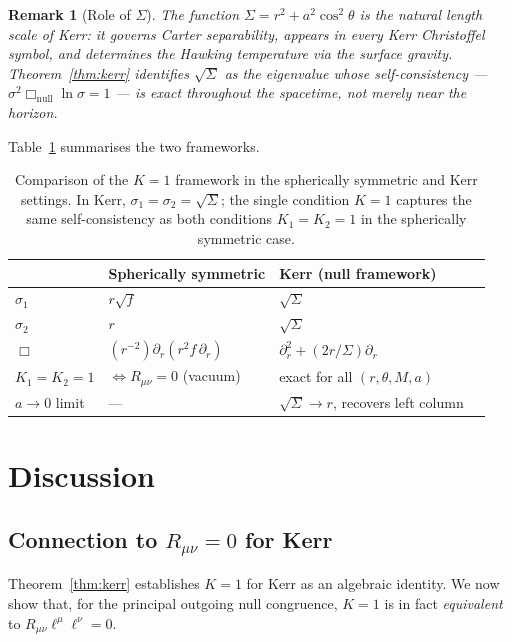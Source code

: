 \documentclass[11pt,a4paper]{article}
\newtheorem*{remark}{Remark}
\begin{document}
\begin{remark}[Role of $\Sigma$]
The function $\Sigma=r^2+a^2\cos^2\!\theta$ is the natural
length scale of Kerr: it governs Carter separability, appears in
every Kerr Christoffel symbol, and determines the Hawking
temperature via the surface gravity.
Theorem~\ref{thm:kerr} identifies $\sqrt{\Sigma}$ as the
eigenvalue whose self-consistency — $\sigma^2\Box_\mathrm{null}
\ln\sigma=1$ — is exact throughout the spacetime, not merely
near the horizon.
\end{remark}

Table~\ref{tab:comparison} summarises the two frameworks.

\begin{table}[h]
\centering
\renewcommand{\arraystretch}{1.3}
\begin{tabular}{@{}llll@{}}
\toprule
 & Spherically symmetric & Kerr (null framework) \\
\midrule
$\sigma_1$ & $r\sqrt{f}$ & $\sqrt{\Sigma}$ \\
$\sigma_2$ & $r$         & $\sqrt{\Sigma}$ \\
$\Box$ & $(r^{-2})\partial_r(r^2 f\,\partial_r)$
       & $\partial_r^2+(2r/\Sigma)\partial_r$ \\
$K_1=K_2=1$ & $\Leftrightarrow R_{\mu\nu}=0$ (vacuum) &
  exact for all $(r,\theta,M,a)$ \\
$a\to 0$ limit & --- & $\sqrt{\Sigma}\to r$, recovers left column \\
\bottomrule
\end{tabular}
\caption{Comparison of the $K{=}1$ framework in the spherically
symmetric and Kerr settings.
In Kerr, $\sigma_1=\sigma_2=\sqrt{\Sigma}$; the single condition
$K{=}1$ captures the same self-consistency as both conditions
$K_1=K_2=1$ in the spherically symmetric case.}
\label{tab:comparison}
\end{table}

\section{Discussion}\label{sec:discussion}

\subsection*{Connection to $R_{\mu\nu}=0$ for Kerr}

Theorem~\ref{thm:kerr} establishes $K{=}1$ for Kerr as an
algebraic identity.
We now show that, for the principal outgoing null congruence,
$K{=}1$ is in fact \emph{equivalent} to
$R_{\mu\nu}\ell^\mu\ell^\nu=0$.
\end{document}
